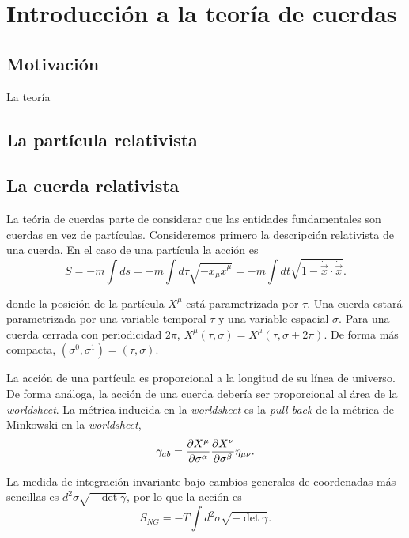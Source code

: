 \chapter{Introducción a la teoría de cuerdas}


\section{Motivación}

La teoría

\section{La partícula relativista}


\section{La cuerda relativista}

La teória de cuerdas parte de considerar que las entidades fundamentales son cuerdas
en vez de partículas. 
Consideremos primero la descripción relativista de una cuerda. En el caso de una
partícula la acción es
\begin{equation}
  S=-m\int ds = -m\int d\tau \sqrt{-\dot{x}_\mu\dot{x}^\mu}=-m\int dt \sqrt{1-\dot {\vec{x}} \cdot \dot {\vec{x}}}.
\end{equation}

donde la posición de la partícula $X^\mu$ está parametrizada por $\tau$.
Una cuerda estará parametrizada por una variable temporal $\tau$ y una variable espacial $\sigma$.
Para una cuerda cerrada con periodicidad $2\pi$, $X^\mu(\tau,\sigma)=X^\mu(\tau,\sigma+2\pi)$.
De forma más compacta, $(\sigma^0,\sigma^1)=(\tau,\sigma)$.

La acción de una partícula es proporcional a la longitud de su línea de universo.
De forma análoga, la acción de una cuerda debería ser proporcional al área de la
\emph{worldsheet}. 
La métrica inducida en la \emph{worldsheet} es la \emph{pull-back} de la métrica de Minkowski
en la \emph{worldsheet},
\begin{equation}
  \gamma_{ab}=\pdv{X^\mu}{\sigma^\alpha}\pdv{X^\nu}{\sigma^\beta}\eta_{\mu\nu}.
\end{equation}

La medida de integración invariante bajo cambios generales de coordenadas más sencillas 
es $d^2\sigma \sqrt{-\det\gamma}$, por lo que la acción es
\begin{equation}
  S_{NG}=-T\int d^2\sigma \sqrt{-\det\gamma}.
\end{equation}

